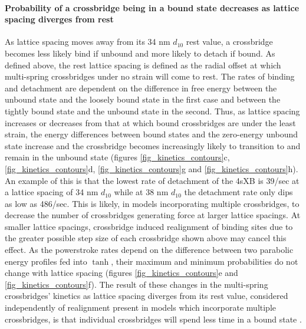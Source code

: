 \documentclass[]{article}
\begin{document}
\paragraph{Probability of a crossbridge being in a bound state decreases as lattice spacing diverges from rest} %
As lattice spacing moves away from its 34 nm $d_{10}$ rest value, a crossbridge becomes less likely bind if unbound and more likely to detach if bound.
As defined above, the rest lattice spacing is defined as the radial offset at which multi-spring crossbridges under no strain will come to rest.
The rates of binding and detachment are dependent on the difference in free energy between the unbound state and the loosely bound state in the first case and between the tightly bound state and the unbound state in the second.
Thus, as lattice spacing increases or decreases from that at which bound crossbridges are under the least strain, the energy differences between bound states and the zero-energy unbound state increase and the crossbridge becomes increasingly likely to transition to and remain in the unbound state (figures \ref{fig_kinetics_contours}c, \ref{fig_kinetics_contours}d, \ref{fig_kinetics_contours}g and \ref{fig_kinetics_contours}h). 
An example of this is that the lowest rate of detachment of the 4sXB is 39/sec at a lattice spacing of 34 nm $d_{10}$ while at 38 nm $d_{10}$ the detachment rate only dips as low as 486/sec.
This is likely, in models incorporating multiple crossbridges, to decrease the number of crossbridges generating force at larger lattice spacings. 
At smaller lattice spacings, crossbridge induced realignment of binding sites due to the greater possible step size of each crossbridge shown above may cancel this effect.
As the powerstroke rates depend on the difference between two parabolic energy profiles fed into $\tanh$, their maximum and minimum probabilities do not change with lattice spacing (figures \ref{fig_kinetics_contours}e and \ref{fig_kinetics_contours}f). 
The result of these changes in the multi-spring crossbridges' kinetics as lattice spacing diverges from its rest value, considered independently of realignment present in models which incorporate multiple crossbridges, is that individual crossbridges will spend less time in a bound state . 
\end{document}

